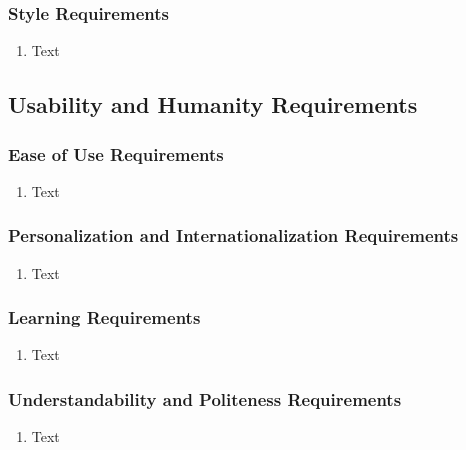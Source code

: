 \documentclass [11pt]{article}
\begin{document}
\subsubsection{Style Requirements}
	\begin{enumerate}[label=\textbf{(\roman*)}]
		\item Text
	\end{enumerate}

\subsection{Usability and Humanity Requirements} 

\subsubsection{Ease of Use Requirements}
	\begin{enumerate}[label=\textbf{(\roman*)}]
		\item Text
	\end{enumerate}

\subsubsection{Personalization and Internationalization Requirements}
	\begin{enumerate}[label=\textbf{(\roman*)}]
		\item Text
	\end{enumerate}

\subsubsection{Learning Requirements }
	\begin{enumerate}[label=\textbf{(\roman*)}]
		\item Text
	\end{enumerate}

\subsubsection{Understandability and Politeness Requirements}
	\begin{enumerate}[label=\textbf{(\roman*)}]
		\item Text
	\end{enumerate}
\end{document}
